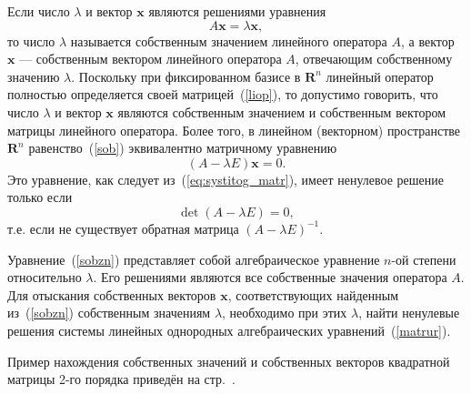 \documentclass[10pt]{article}
\numberwithin{primer}{section}
\numberwithin{equation}{section}
\begin{document}
Если число $\lambda$ и вектор $\mathbf{x}$ являются решениями уравнения
\begin{equation}\label{sob}
A\mathbf{x}=\lambda\mathbf{x},
\end{equation}
то число $\lambda$ называется собственным значением линейного оператора $A$, а вектор $\mathbf{x}$ --- собственным вектором линейного оператора $A$, отвечающим собственному значению $\lambda$. Поскольку при фиксированном базисе в $\mathbf{R}^n$ линейный оператор полностью определяется своей матрицей~(\ref{liop}), то допустимо говорить, что число $\lambda$ и вектор $\mathbf{x}$ являются собственным значением и собственным вектором матрицы линейного оператора. Более того, в линейном (векторном) пространстве $\mathbf{R}^n$ равенство~(\ref{sob}) эквивалентно матричному уравнению
\begin{equation}\label{matrur}
\left(A-\lambda E\right)\mathbf{x}=0.
\end{equation}
Это уравнение, как следует из~(\ref{eq:systitog_matr}), имеет ненулевое решение только если
\begin{equation}\label{sobzn}
\det\left(A-\lambda E\right)=0,
\end{equation}
т.е. если не существует обратная матрица $\left(A-\lambda E\right)^{-1}$.

Уравнение~(\ref{sobzn}) представляет собой алгебраическое уравнение $n$-ой степени относительно $\lambda$. Его решениями являются все собственные значения оператора $A$. Для отыскания собственных векторов $\mathbf{x}$, соответствующих найденным из~(\ref{sobzn}) собственным значениям $\lambda$, необходимо при этих $\lambda$, найти ненулевые решения системы линейных однородных алгебраических уравнений~(\ref{matrur}).

Пример нахождения собственных значений и собственных векторов квадратной матрицы 2-го порядка приведён на стр.~\pageref{sob2}.
\end{document}
